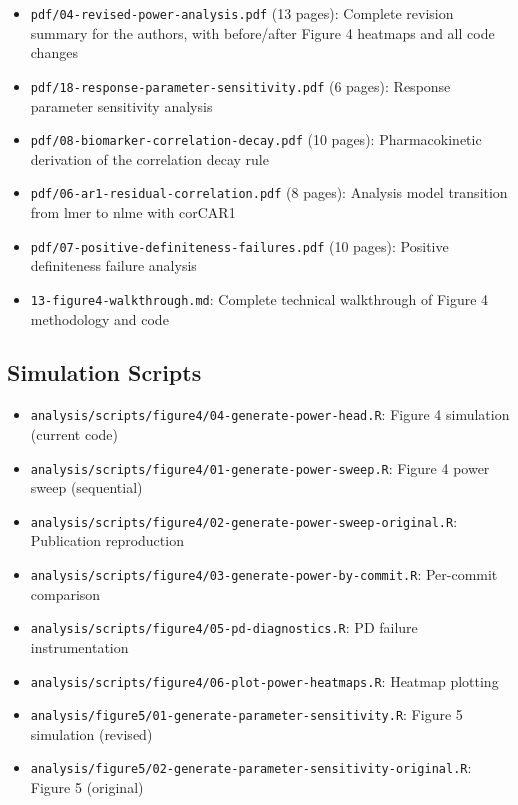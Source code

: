 \documentclass[11pt]{article}
\begin{document}
\begin{itemize}
  \item \texttt{pdf/04-revised-power-analysis.pdf} (13 pages): Complete
    revision summary for the authors, with before/after
    Figure 4 heatmaps and all code changes
  \item \texttt{pdf/18-response-parameter-sensitivity.pdf} (6 pages):
    Response parameter sensitivity analysis
  \item \texttt{pdf/08-biomarker-correlation-decay.pdf} (10 pages):
    Pharmacokinetic derivation of the correlation decay rule
  \item \texttt{pdf/06-ar1-residual-correlation.pdf} (8 pages): Analysis
    model transition from lmer to nlme with corCAR1
  \item \texttt{pdf/07-positive-definiteness-failures.pdf} (10 pages):
    Positive definiteness failure analysis
  \item \texttt{13-figure4-walkthrough.md}: Complete technical walkthrough
    of Figure 4 methodology and code
\end{itemize}

\subsection{Simulation Scripts}

\begin{itemize}
  \item \texttt{analysis/scripts/figure4/04-generate-power-head.R}: Figure 4 simulation (current code)
  \item \texttt{analysis/scripts/figure4/01-generate-power-sweep.R}: Figure 4 power sweep (sequential)
  \item \texttt{analysis/scripts/figure4/02-generate-power-sweep-original.R}: Publication reproduction
  \item \texttt{analysis/scripts/figure4/03-generate-power-by-commit.R}: Per-commit comparison
  \item \texttt{analysis/scripts/figure4/05-pd-diagnostics.R}: PD failure instrumentation
  \item \texttt{analysis/scripts/figure4/06-plot-power-heatmaps.R}: Heatmap plotting
  \item \texttt{analysis/figure5/01-generate-parameter-sensitivity.R}: Figure 5 simulation (revised)
  \item \texttt{analysis/figure5/02-generate-parameter-sensitivity-original.R}: Figure 5 (original)
\end{itemize}
\end{document}
